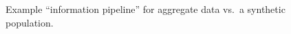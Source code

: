 \documentclass[fancy, oneside, mastersfancy, ms]{byuthesis}
\begin{document}
\begin{figure}

\begin{minipage}{\linewidth}



\end{minipage}%
\newline
\begin{minipage}{\linewidth}



\end{minipage}%

\caption{\label{fig-pipeline-example}Example ``information pipeline''
for aggregate data vs.~a synthetic population.}

\end{figure}%
\end{document}
